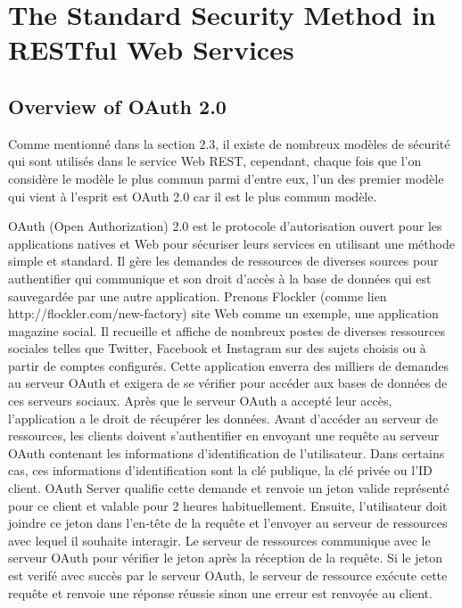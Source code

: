 \chapter{ The Standard Security Method in RESTful Web Services}
\section{Overview of OAuth 2.0}
Comme mentionné dans la section 2.3, il existe de nombreux modèles de sécurité qui sont utilisés dans le service Web REST, cependant, chaque fois que l'on considère le modèle le plus commun parmi d'entre eux, l'un des premier modèle qui vient à l'esprit est OAuth 2.0 car il est le plus commun modèle.

OAuth (Open Authorization) 2.0 est le protocole d'autorisation ouvert pour les applications natives et Web pour sécuriser leurs services en utilisant une méthode simple et standard. Il gère les demandes de ressources de diverses sources pour authentifier qui communique et son droit d'accès à la base de données qui est sauvegardée par une autre application. Prenons Flockler (comme lien http://flockler.com/new-factory) site Web comme un exemple, une application magazine social. Il recueille et affiche de nombreux postes de diverses ressources sociales telles que Twitter, Facebook et Instagram sur des sujets choisis ou à partir de comptes configurés. Cette application enverra des milliers de demandes au serveur OAuth et exigera de se vérifier pour accéder aux bases de données de ces serveurs sociaux. Après que le serveur OAuth a accepté leur accès, l'application a le droit de récupérer les données.
Avant d'accéder au serveur de ressources, les clients doivent s'authentifier  en envoyant une requête au serveur OAuth contenant les informations d'identification de l'utilisateur. Dans certains cas, ces informations d'identification sont la clé publique, la clé privée ou l'ID client. OAuth Server qualifie cette demande et renvoie un jeton valide représenté pour ce client et valable pour 2 heures habituellement. Ensuite, l'utilisateur doit joindre ce jeton dans l'en-tête de la requête et l'envoyer au serveur de ressources avec lequel il souhaite interagir. Le serveur de ressources communique avec le serveur OAuth pour vérifier le jeton après la réception de la requête. Si le jeton est verifé avec succès par le serveur OAuth, le serveur de ressource exécute cette requête et renvoie une réponse réussie sinon une erreur est renvoyée au client.

